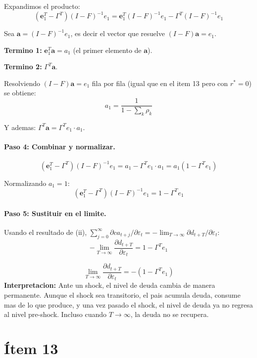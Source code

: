 Expandimos el producto:
\[
    (\mathbf{e}_1^T - \Gamma^T)(I-F)^{-1}e_1
    = \mathbf{e}_1^T(I-F)^{-1}e_1 - \Gamma^T(I-F)^{-1}e_1
\]

Sea $\mathbf{a} = (I-F)^{-1}e_1$, es decir el vector que resuelve $(I-F)\mathbf{a} = e_1$.

\textbf{Termino 1:} $\mathbf{e}_1^T \mathbf{a} = a_1$ (el primer elemento de $\mathbf{a}$).

\textbf{Termino 2:} $\Gamma^T \mathbf{a}$.

Resolviendo $(I-F)\mathbf{a} = e_1$ fila por fila (igual que en el item 13 pero con $r^* = 0$) se obtiene:
\[
    a_1 = \frac{1}{1 - \sum_k \rho_k}
\]

Y ademas: $\Gamma^T \mathbf{a} = \Gamma^T e_1 \cdot a_1$.

\paragraph{Paso 4: Combinar y normalizar.}

\[
    (\mathbf{e}_1^T - \Gamma^T)(I-F)^{-1}e_1
    = a_1 - \Gamma^T e_1 \cdot a_1
    = a_1(1 - \Gamma^T e_1)
\]

Normalizando $a_1 = 1$:
\[
    (\mathbf{e}_1^T - \Gamma^T)(I-F)^{-1}e_1 = 1 - \Gamma^T e_1
\]

\paragraph{Paso 5: Sustituir en el limite.}

Usando el resultado de (ii), $\sum_{j=0}^\infty \partial ca_{t+j}/\partial\varepsilon_t = -\lim_{T\to\infty} \partial d_{t+T}/\partial \varepsilon_t$:
\[
    -\lim_{T\to\infty} \frac{\partial d_{t+T}}{\partial \varepsilon_t} = 1 - \Gamma^T e_1
\]

\begin{resultado}
\[
    \lim_{T\to\infty} \frac{\partial d_{t+T}}{\partial \varepsilon_t} = -(1 - \Gamma^T e_1)
\]
\textbf{Interpretacion:} Ante un shock, el nivel de deuda cambia de manera permanente. Aunque el shock sea transitorio, el pais acumula deuda, consume mas de lo que produce, y una vez pasado el shock, el nivel de deuda ya no regresa al nivel pre-shock. Incluso cuando $T \to \infty$, la deuda no se recupera.
\end{resultado}

\section*{Ítem 13}

